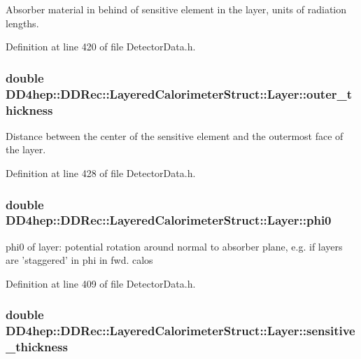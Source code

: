 Absorber material in behind of sensitive element in the layer, units of radiation lengths. 

Definition at line 420 of file DetectorData.h.\hypertarget{struct_d_d4hep_1_1_d_d_rec_1_1_layered_calorimeter_struct_1_1_layer_aad0fde2a5b642bc6dd0ff6a08a594da0}{
\subsubsection[{outer\_\-thickness}]{\setlength{\rightskip}{0pt plus 5cm}double {\bf DD4hep::DDRec::LayeredCalorimeterStruct::Layer::outer\_\-thickness}}}
\label{struct_d_d4hep_1_1_d_d_rec_1_1_layered_calorimeter_struct_1_1_layer_aad0fde2a5b642bc6dd0ff6a08a594da0}


Distance between the center of the sensitive element and the outermost face of the layer. 

Definition at line 428 of file DetectorData.h.\hypertarget{struct_d_d4hep_1_1_d_d_rec_1_1_layered_calorimeter_struct_1_1_layer_aab79660830a8d520db2439c5a817f709}{
\subsubsection[{phi0}]{\setlength{\rightskip}{0pt plus 5cm}double {\bf DD4hep::DDRec::LayeredCalorimeterStruct::Layer::phi0}}}
\label{struct_d_d4hep_1_1_d_d_rec_1_1_layered_calorimeter_struct_1_1_layer_aab79660830a8d520db2439c5a817f709}


phi0 of layer: potential rotation around normal to absorber plane, e.g. if layers are 'staggered' in phi in fwd. calos 

Definition at line 409 of file DetectorData.h.\hypertarget{struct_d_d4hep_1_1_d_d_rec_1_1_layered_calorimeter_struct_1_1_layer_af1137d1b807db356fee6095e24aa5cea}{
\subsubsection[{sensitive\_\-thickness}]{\setlength{\rightskip}{0pt plus 5cm}double {\bf DD4hep::DDRec::LayeredCalorimeterStruct::Layer::sensitive\_\-thickness}}}
\label{struct_d_d4hep_1_1_d_d_rec_1_1_layered_calorimeter_struct_1_1_layer_af1137d1b807db356fee6095e24aa5cea}


